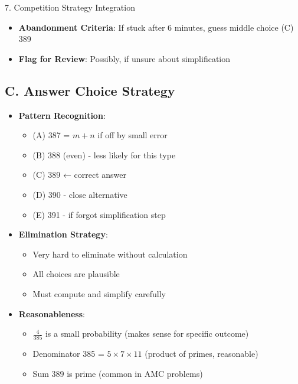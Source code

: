 \documentclass[12pt]{article}
\begin{document}
\begin{competitionbox}{7. Competition Strategy Integration}
\begin{itemize}[leftmargin=*]
    \item \textbf{Abandonment Criteria}: If stuck after 6 minutes, guess middle choice (C) 389
    
    \item \textbf{Flag for Review}: Possibly, if unsure about simplification
\end{itemize}

\subsection*{C. Answer Choice Strategy}
\begin{itemize}[leftmargin=*]
    \item \textbf{Pattern Recognition}:
    \begin{itemize}
        \item (A) 387 = $m + n$ if off by small error
        \item (B) 388 (even) - less likely for this type
        \item (C) 389 ← correct answer
        \item (D) 390 - close alternative
        \item (E) 391 - if forgot simplification step
    \end{itemize}
    
    \item \textbf{Elimination Strategy}:
    \begin{itemize}
        \item Very hard to eliminate without calculation
        \item All choices are plausible
        \item Must compute and simplify carefully
    \end{itemize}
    
    \item \textbf{Reasonableness}:
    \begin{itemize}
        \item $\frac{4}{385}$ is a small probability (makes sense for specific outcome)
        \item Denominator 385 = $5 \times 7 \times 11$ (product of primes, reasonable)
        \item Sum $389$ is prime (common in AMC problems)
    \end{itemize}
\end{itemize}


\end{competitionbox}
\end{document}
